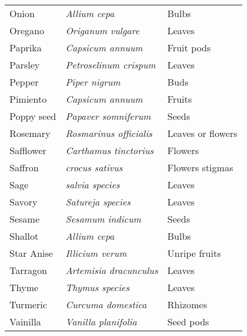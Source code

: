 {\begin{tabular}{|l| >{\em} l|l|}
Onion & Allium cepa & Bulbs \\ 
Oregano & Origanum vulgare & Leaves \\ 
Paprika & Capsicum annuum & Fruit pods \\ 
Parsley & Petroselinum crispum & Leaves \\ 
Pepper & Piper nigrum & Buds \\ 
Pimiento & Capsicum annuum & Fruits \\ 
Poppy seed & Papaver somniferum & Seeds \\ 
Rosemary & Rosmarinus officialis & Leaves or flowers \\ 
Safflower & Carthamus tinctorius & Flowers \\ 
Saffron & crocus sativus & Flowers stigmas \\ 
Sage & salvia species & Leaves \\ 
Savory & Satureja species & Leaves \\ 
Sesame & Sesamum indicum & Seeds \\ 
Shallot & Allium cepa & Bulbs \\ 
Star Anise & Illicium verum & Unripe fruits \\ 
Tarragon & Artemisia dracunculus & Leaves \\ 
Thyme & Thymus species & Leaves \\ 
Turmeric & Curcuma domestica & Rhizomes \\ 
Vainilla & Vanilla planifolia & Seed pods \\ 
\hline
\end{tabular}
}



